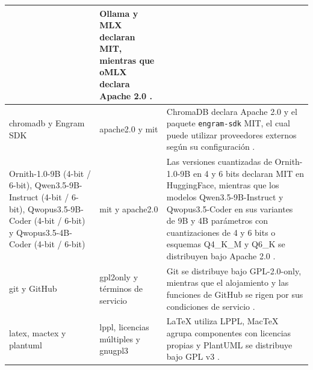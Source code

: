 \begin{table}[p]
\begin{tabularx}{\textwidth}{
            |>{\raggedright\arraybackslash}p{3.6cm}
            |>{\raggedright\arraybackslash}p{3.1cm}
            |>{\raggedright\arraybackslash}X|
        }
                                    & Ollama y MLX declaran MIT, mientras que oMLX declara Apache 2.0 \cite{ollamaLicense2026,mlxLicense2026,omlx2026}.                                                                                                                                                                                                                                     \\ \hline
        \Gls{chromadb} y Engram SDK
                                    & \gls{apache2.0} y \gls{mit}
                                    & ChromaDB declara Apache 2.0 y el paquete \texttt{engram-sdk} MIT, el cual puede utilizar proveedores externos según su configuración \cite{chroma2026,engramSdk2026}.                                                                                                                                                                                 \\ \hline
        Ornith-1.0-9B (4-bit / 6-bit), Qwen3.5-9B-Instruct (4-bit / 6-bit), Qwopus3.5-9B-Coder (4-bit / 6-bit) y Qwopus3.5-4B-Coder (4-bit / 6-bit)
                                    & \gls{mit} y \gls{apache2.0}
                                    & Las versiones cuantizadas de Ornith-1.0-9B en 4 y 6 bits declaran MIT en HuggingFace, mientras que los modelos Qwen3.5-9B-Instruct y Qwopus3.5-Coder en sus variantes de 9B y 4B parámetros con cuantizaciones de 4 y 6 bits o esquemas Q4\_K\_M y Q6\_K se distribuyen bajo Apache 2.0 \cite{ornith9b4,ornith9b6,qwen359b}.                          \\ \hline
        \Gls{git} y GitHub
                                    & \gls{gpl2only} y términos de servicio
                                    & Git se distribuye bajo GPL-2.0-only, mientras que el alojamiento y las funciones de GitHub se rigen por sus condiciones de servicio \cite{gitLicense2026,githubTerms2026}.                                                                                                                                                                            \\ \hline
        \Gls{latex}, \gls{mactex} y \gls{plantuml}
                                    & \gls{lppl}, licencias múltiples y \gls{gnugpl3}
                                    & LaTeX utiliza LPPL, MacTeX agrupa componentes con licencias propias y PlantUML se distribuye bajo GPL v3 \cite{latexLicense2026,mactex2026,plantumlLicense2026}.                                                                                                                                                                                      \\ \hline

\end{tabularx}
\end{table}
